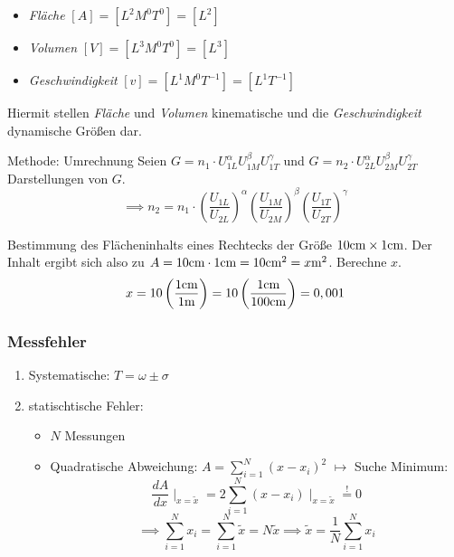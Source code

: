 \documentclass[a4paper,10pt]{scrartcl}
\begin{document}
\begin{ex}

\begin{itemize}
 \item \emph{Fläche} $[A]=[L^2 M^0 T^0]=[L^2]$
 \item \emph{Volumen} $[V]=[L^3M^0T^0]=[L^3]$
 \item \emph{Geschwindigkeit} $[v]=[L^1M^0T^{-1}]=[L^1 T^{-1}]$
\end{itemize}
Hiermit stellen \emph{Fläche} und \emph{Volumen} kinematische und die \emph{Geschwindigkeit} dynamische Größen dar.
\end{ex}
\newpage  
\begin{seg}{Methode: Umrechnung}
 Seien $G=n_1\cdot U_{1L}^\alpha U_{1M}^\beta U_{1T}^\gamma$ und $G=n_2\cdot U_{2L}^\alpha U_{2M}^\beta U_{2T}^\gamma$ Darstellungen von $G$.
 \[
  \implies n_2=n_1 \cdot \left ( \frac{U_{1L}}{U_{2L}} \right )^\alpha \left ( \frac{U_{1M}}{U_{2M}} \right )^\beta \left ( \frac{U_{1T}}{U_{2T}} \right )^\gamma
 \]
\end{seg}
\begin{ex}
 Bestimmung des Flächeninhalts eines Rechtecks der Größe $10 \text{cm} \times 1\text{cm}$.  Der Inhalt ergibt sich also zu $A=10\text{cm}\cdot 1 \text{cm}=10\text{cm}^2=x\text{m}^2$.  Berechne $x$.
\[
 x=10 \left ( \frac{1 \text{cm}}{1 \text{m}} \right ) = 10 \left ( \frac{1 \text{cm}}{100 \text{cm}} \right )=0,001
\]

\end{ex}

\subsubsection{Messfehler}
\begin{enumerate}
 \item Systematische: $T=\omega \pm \sigma$
 \item statischtische Fehler:
 \begin{itemize}
  \item $N$ Messungen
  \item Quadratische Abweichung: $A=\sum_{i=1}^{N}(x-x_i)^2$
\subitem $\mapsto$ Suche Minimum:
\[
 \frac{dA}{dx} \mid_{x=\tilde x}=2 \sum_{i=1}^N(x-x_i) \mid_{x=\tilde x}\stackrel{!}{=}0
\]
\[
  \implies \sum_{i=1}^N x_i=\sum_{i=1}^N \tilde x=N\tilde x \implies \tilde x=\frac{1}{N}  \sum_{i=1}^N x_i
\]


 \end{itemize}

\end{enumerate}
\end{document}
